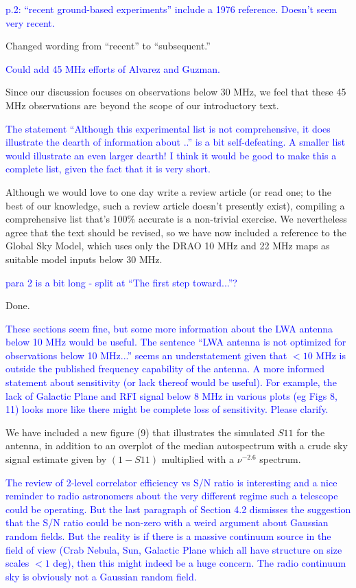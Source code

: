 \documentclass[11pt]{article}
\begin{document}
\noindent \textcolor{blue}{p.2: ``recent ground-based experiments''
  include a 1976 reference. Doesn't seem very recent.}

Changed wording from ``recent'' to ``subsequent.''

\noindent \textcolor{blue}{Could add 45 MHz efforts of Alvarez and
  Guzman.}

Since our discussion focuses on observations below 30 MHz, we feel
that these 45 MHz observations are beyond the scope of our
introductory text.

\noindent \textcolor{blue}{The statement ``Although this experimental
  list is not comprehensive, it does illustrate the dearth of
  information about ..'' is a bit self-defeating. A smaller list would
  illustrate an even larger dearth! I think it would be good to make
  this a complete list, given the fact that it is very short.}

Although we would love to one day write a review article (or read one;
to the best of our knowledge, such a review article doesn't presently
exist), compiling a comprehensive list that's 100\% accurate is a
non-trivial exercise.  We nevertheless agree that the text should be
revised, so we have now included a reference to the Global Sky Model,
which uses only the DRAO 10 MHz and 22 MHz maps as suitable model
inputs below 30 MHz.

\noindent \textcolor{blue}{para 2 is a bit long - split at ``The first step toward...''?}

Done.

\noindent \textcolor{blue}{These sections seem fine, but some more
  information about the LWA antenna below 10 MHz would be useful. The
  sentence ``LWA antenna is not optimized for observations below 10
  MHz...'' seems an understatement given that $<10$ MHz is outside the
  published frequency capability of the antenna. A more informed
  statement about sensitivity (or lack thereof would be useful). For
  example, the lack of Galactic Plane and RFI signal below 8 MHz in
  various plots (eg Figs 8, 11) looks more like there might be
  complete loss of sensitivity. Please clarify.}

We have included a new figure (9) that illustrates the simulated $S11$
for the antenna, in addition to an overplot of the median autospectrum
with a crude sky signal estimate given by $(1-S11)$ multiplied with a
$\nu^{-2.6}$ spectrum.

\noindent \textcolor{blue}{The review of 2-level correlator efficiency
  vs S/N ratio is interesting and a nice reminder to radio astronomers
  about the very different regime such a telescope could be
  operating. But the last paragraph of Section 4.2 dismisses the
  suggestion that the S/N ratio could be non-zero with a weird
  argument about Gaussian random fields. But the reality is if there
  is a massive continuum source in the field of view (Crab Nebula,
  Sun, Galactic Plane which all have structure on size scales $<1$
  deg), then this might indeed be a huge concern. The radio continuum
  sky is obviously not a Gaussian random field.}
\end{document}
